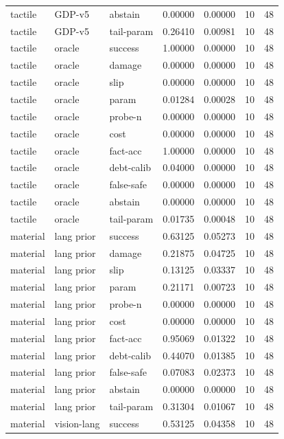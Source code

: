 \documentclass{article}
\begin{document}
\begin{center}
\begin{longtable}{lllllll}
tactile & GDP-v5 & abstain & 0.00000 & 0.00000 & 10 & 48 \\
tactile & GDP-v5 & tail-param & 0.26410 & 0.00981 & 10 & 48 \\
tactile & oracle & success & 1.00000 & 0.00000 & 10 & 48 \\
tactile & oracle & damage & 0.00000 & 0.00000 & 10 & 48 \\
tactile & oracle & slip & 0.00000 & 0.00000 & 10 & 48 \\
tactile & oracle & param & 0.01284 & 0.00028 & 10 & 48 \\
tactile & oracle & probe-n & 0.00000 & 0.00000 & 10 & 48 \\
tactile & oracle & cost & 0.00000 & 0.00000 & 10 & 48 \\
tactile & oracle & fact-acc & 1.00000 & 0.00000 & 10 & 48 \\
tactile & oracle & debt-calib & 0.04000 & 0.00000 & 10 & 48 \\
tactile & oracle & false-safe & 0.00000 & 0.00000 & 10 & 48 \\
tactile & oracle & abstain & 0.00000 & 0.00000 & 10 & 48 \\
tactile & oracle & tail-param & 0.01735 & 0.00048 & 10 & 48 \\
material & lang prior & success & 0.63125 & 0.05273 & 10 & 48 \\
material & lang prior & damage & 0.21875 & 0.04725 & 10 & 48 \\
material & lang prior & slip & 0.13125 & 0.03337 & 10 & 48 \\
material & lang prior & param & 0.21171 & 0.00723 & 10 & 48 \\
material & lang prior & probe-n & 0.00000 & 0.00000 & 10 & 48 \\
material & lang prior & cost & 0.00000 & 0.00000 & 10 & 48 \\
material & lang prior & fact-acc & 0.95069 & 0.01322 & 10 & 48 \\
material & lang prior & debt-calib & 0.44070 & 0.01385 & 10 & 48 \\
material & lang prior & false-safe & 0.07083 & 0.02373 & 10 & 48 \\
material & lang prior & abstain & 0.00000 & 0.00000 & 10 & 48 \\
material & lang prior & tail-param & 0.31304 & 0.01067 & 10 & 48 \\
material & vision-lang & success & 0.53125 & 0.04358 & 10 & 48 \\
\bottomrule
\end{longtable}
\renewcommand{\arraystretch}{1.0}
\end{center}
\end{document}
